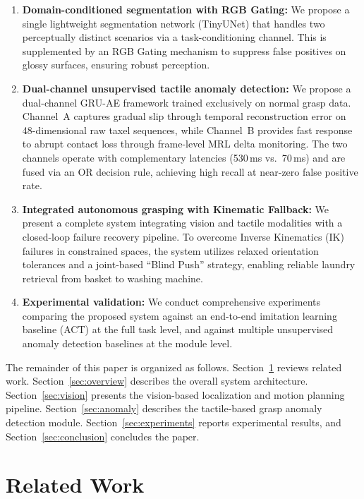 \documentclass[pdflatex,sn-mathphys-num]{sn-jnl}%
\theoremstyle{thmstyleone}%
\theoremstyle{thmstyletwo}%
\theoremstyle{thmstylethree}%
\begin{document}
\begin{enumerate}
    \item \textbf{Domain-conditioned segmentation with RGB Gating:}
    We propose a single lightweight segmentation network (TinyUNet) that handles two perceptually distinct scenarios via a task-conditioning channel. This is supplemented by an RGB Gating mechanism to suppress false positives on glossy surfaces, ensuring robust perception.

    \item \textbf{Dual-channel unsupervised tactile anomaly detection:}
    We propose a dual-channel GRU-AE framework trained exclusively on normal grasp data. Channel~A captures gradual slip through temporal reconstruction error on 48-dimensional raw taxel sequences, while Channel~B provides fast response to abrupt contact loss through frame-level MRL delta monitoring. The two channels operate with complementary latencies (530\,ms vs.\ 70\,ms) and are fused via an OR decision rule, achieving high recall at near-zero false positive rate.

    \item \textbf{Integrated autonomous grasping with Kinematic Fallback:}
    We present a complete system integrating vision and tactile modalities with a closed-loop failure recovery pipeline. To overcome Inverse Kinematics (IK) failures in constrained spaces, the system utilizes relaxed orientation tolerances and a joint-based ``Blind Push'' strategy, enabling reliable laundry retrieval from basket to washing machine.

    \item \textbf{Experimental validation:}
    We conduct comprehensive experiments comparing the proposed system against an end-to-end imitation learning baseline (ACT) at the full task level, and against multiple unsupervised anomaly detection baselines at the module level.
\end{enumerate}

The remainder of this paper is organized as follows. Section~\ref{sec:related} reviews related work. Section~\ref{sec:overview} describes the overall system architecture. Section~\ref{sec:vision} presents the vision-based localization and motion planning pipeline. Section~\ref{sec:anomaly} describes the tactile-based grasp anomaly detection module. Section~\ref{sec:experiments} reports experimental results, and Section~\ref{sec:conclusion} concludes the paper.

\section{Related Work}
\label{sec:related}
\end{document}
